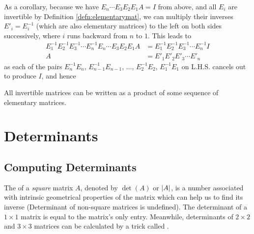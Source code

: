 As a corollary, because we have $E_n \cdots E_{3}E_{2}E_{1}A = I$ from above, and all $E_i$ are invertible by Definition \ref{defn:elementarymat}, we can multiply their inverses $E'_i = E_i^{-1}$ (which are also elementary matrices) to the left on both sides successively, where $i$ runs backward from $n$ to $1$. This leads to
\begin{align}
E_{1}^{-1}E_{2}^{-1}E_{3}^{-1}\cdots E_n^{-1}E_n \cdots E_{3}E_{2}E_{1}A &= E_{1}^{-1}E_{2}^{-1}E_{3}^{-1}\cdots E_n^{-1}I \nonumber \\
A &= E'_{1}E'_{2}E'_{3}\cdots E'_n
\end{align}
as each of the pairs $E_n^{-1}E_n$, $E_{n-1}^{-1}E_{n-1}$, $\ldots$, $E_2^{-1}E_2$, $E_1^{-1}E_1$ on L.H.S. cancels out to produce $I$, and hence
\begin{proper}
\label{proper:invseqelement}
All invertible matrices can be written as a product of some sequence of elementary matrices. 
\end{proper}

\section{Determinants}
\label{section:det}
\subsection{Computing Determinants}
The  of a \textit{square} matrix $A$, denoted by $\det(A)$ or $\abs{A}$, is a number associated with intrinsic geometrical properties of the matrix which can help us to find its inverse (Determinant of non-square matrices is undefined). The determinant of a $1 \times 1$ matrix is equal to the matrix's only entry. Meanwhile, determinants of $2 \times 2$ and $3 \times 3$ matrices can be calculated by a trick called .
